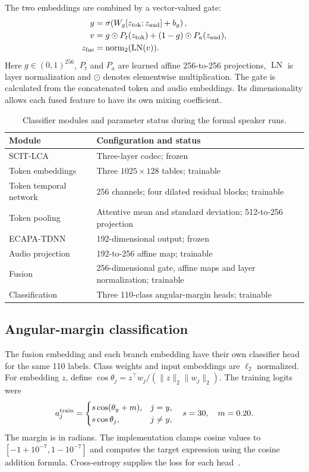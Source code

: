 The two embeddings are combined by a vector-valued gate:
\begin{align}
 g&=\sigma\!\left(W_g[z_{\rm tok};z_{\rm aud}]+b_g\right),
 \nonumber\\
 v&=g\odot P_t(z_{\rm tok})+(1-g)\odot P_a(z_{\rm aud}),
 \nonumber\\
 z_{\rm fus}&=\operatorname{norm}_2(\operatorname{LN}(v)).
 \label{eq:sv2-gate}
\end{align}
Here $g\in(0,1)^{256}$, $P_t$ and $P_a$ are learned affine 256-to-256 projections, $\operatorname{LN}$ is layer normalization and $\odot$ denotes elementwise multiplication. The gate is calculated from the concatenated token and audio embeddings. Its dimensionality allows each fused feature to have its own mixing coefficient.

\begin{table}[t]
\centering
\caption{Classifier modules and parameter status during the formal speaker runs.}
\label{tab:sv2-speaker-modules}
\small
\begin{tabularx}{\columnwidth}{@{}YY@{}}
\toprule
Module & Configuration and status\\
\midrule
SCIT-LCA & Three-layer codec; frozen\\
Token embeddings & Three $1025\times128$ tables; trainable\\
Token temporal network & 256 channels; four dilated residual blocks; trainable\\
Token pooling & Attentive mean and standard deviation; 512-to-256 projection\\
ECAPA-TDNN & 192-dimensional output; frozen\\
Audio projection & 192-to-256 affine map; trainable\\
Fusion & 256-dimensional gate, affine maps and layer normalization; trainable\\
Classification & Three 110-class angular-margin heads; trainable\\
\bottomrule
\end{tabularx}
\end{table}

\subsection{Angular-margin classification}
The fusion embedding and each branch embedding have their own classifier head for the same 110 labels. Class weights and input embeddings are $\ell_2$ normalized. For embedding $z$, define $\cos\theta_j=z^\top w_j/(\|z\|_2\|w_j\|_2)$. The training logits were
\begin{equation}
 a_j^{\rm train}=
 \begin{cases}
 s\cos(\theta_y+m), & j=y,\\
 s\cos\theta_j, & j\ne y,
 \end{cases}
 \quad s=30,\quad m=0.20.
 \label{eq:sv2-aam}
\end{equation}
The margin is in radians. The implementation clamps cosine values to $[-1+10^{-7},1-10^{-7}]$ and computes the target expression using the cosine addition formula. Cross-entropy supplies the loss for each head~\cite{arcface}.

